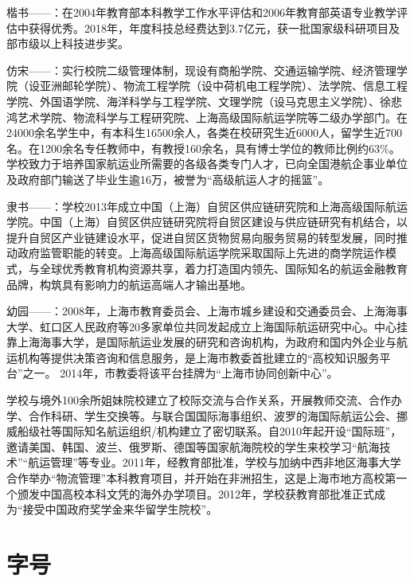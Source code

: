 {楷书——\cs{\kaishu}：\kaishu 在2004年教育部本科教学工作水平评估和2006年教育部英语专业教学评估中获得优秀。2018年，年度科技总经费达到3.7亿元，获一批国家级科研项目及部市级以上科技进步奖。}

{仿宋——：\fangsong 实行校院二级管理体制，现设有商船学院、交通运输学院、经济管理学院（设亚洲邮轮学院）、物流工程学院（设中荷机电工程学院）、法学院、信息工程学院、外国语学院、海洋科学与工程学院、文理学院（设马克思主义学院）、徐悲鸿艺术学院、物流科学与工程研究院、上海高级国际航运学院等二级办学部门。在24000余名学生中，有本科生16500余人，各类在校研究生近6000人，留学生近700名。在1200余名专任教师中，有教授160余名，具有博士学位的教师比例约63\%。学校致力于培养国家航运业所需要的各级各类专门人才，已向全国港航企事业单位及政府部门输送了毕业生逾16万，被誉为“高级航运人才的摇篮”。}

{隶书——：\lishu 学校2013年成立中国（上海）自贸区供应链研究院和上海高级国际航运学院。中国（上海）自贸区供应链研究院将自贸区建设与供应链研究有机结合，以提升自贸区产业链建设水平，促进自贸区货物贸易向服务贸易的转型发展，同时推动政府监管职能的转变。上海高级国际航运学院采取国际上先进的商学院运作模式，与全球优秀教育机构资源共享，着力打造国内领先、国际知名的航运金融教育品牌，构筑具有影响力的航运高端人才输出基地。}

{幼园——：\youyuan 2008年，上海市教育委员会、上海市城乡建设和交通委员会、上海海事大学、虹口区人民政府等20多家单位共同发起成立上海国际航运研究中心。中心挂靠上海海事大学，是国际航运业发展的研究和咨询机构，为政府和国内外企业与航运机构等提供决策咨询和信息服务，是上海市教委首批建立的“高校知识服务平台”之一。 2014年，市教委将该平台挂牌为“上海市协同创新中心”。

学校与境外100余所姐妹院校建立了校际交流与合作关系，开展教师交流、合作办学、合作科研、学生交换等。与联合国国际海事组织、波罗的海国际航运公会、挪威船级社等国际知名航运组织/机构建立了密切联系。自2010年起开设“国际班”，邀请美国、韩国、波兰、俄罗斯、德国等国家航海院校的学生来校学习“航海技术”“航运管理”等专业。2011年，经教育部批准，学校与加纳中西非地区海事大学合作举办“物流管理”本科教育项目，并开始在非洲招生，这是上海市地方高校第一个颁发中国高校本科文凭的海外办学项目。2012年，学校获教育部批准正式成为“接受中国政府奖学金来华留学生院校”。}

\section{字号}

